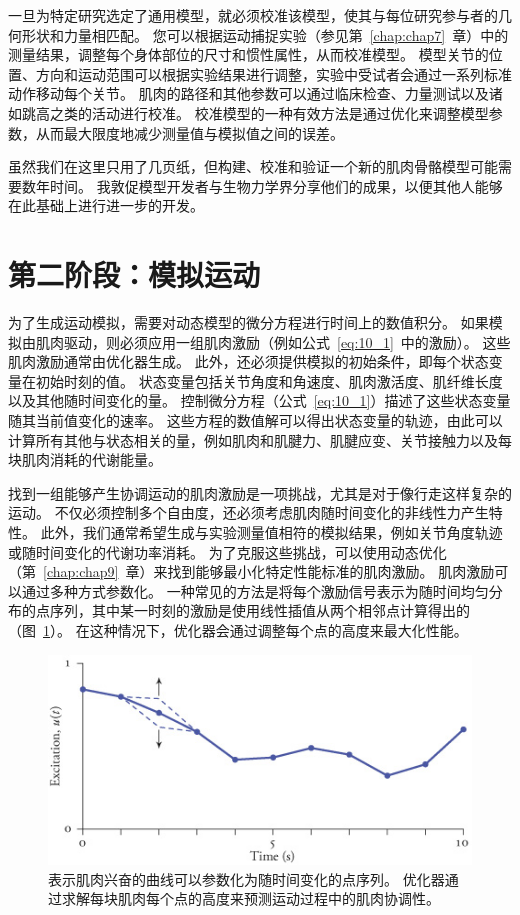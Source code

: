 一旦为特定研究选定了通用模型，就必须校准该模型，使其与每位研究参与者的几何形状和力量相匹配。
您可以根据运动捕捉实验（参见第~\ref{chap:chap7}~章）中的测量结果，调整每个身体部位的尺寸和惯性属性，从而校准模型。
模型关节的位置、方向和运动范围可以根据实验结果进行调整，实验中受试者会通过一系列标准动作移动每个关节。
肌肉的路径和其他参数可以通过临床检查、力量测试以及诸如跳高之类的活动进行校准。
校准模型的一种有效方法是通过优化来调整模型参数，从而最大限度地减少测量值与模拟值之间的误差。


虽然我们在这里只用了几页纸，但构建、校准和验证一个新的肌肉骨骼模型可能需要数年时间。
我敦促模型开发者与生物力学界分享他们的成果，以便其他人能够在此基础上进行进一步的开发。



\section{第二阶段：模拟运动}

为了生成运动模拟，需要对动态模型的微分方程进行时间上的数值积分。
如果模拟由肌肉驱动，则必须应用一组肌肉激励（例如公式~\ref{eq:10_1}~中的激励）。
这些肌肉激励通常由优化器生成。
此外，还必须提供模拟的初始条件，即每个状态变量在初始时刻的值。
状态变量包括关节角度和角速度、肌肉激活度、肌纤维长度以及其他随时间变化的量。
控制微分方程（公式~\ref{eq:10_1}）描述了这些状态变量随其当前值变化的速率。
这些方程的数值解可以得出状态变量的轨迹，由此可以计算所有其他与状态相关的量，例如肌肉和肌腱力、肌腱应变、关节接触力以及每块肌肉消耗的代谢能量。


找到一组能够产生协调运动的肌肉激励是一项挑战，尤其是对于像行走这样复杂的运动。
不仅必须控制多个自由度，还必须考虑肌肉随时间变化的非线性力产生特性。
此外，我们通常希望生成与实验测量值相符的模拟结果，例如关节角度轨迹或随时间变化的代谢功率消耗。
为了克服这些挑战，可以使用动态优化（第~\ref{chap:chap9}~章）来找到能够最小化特定性能标准的肌肉激励。
肌肉激励可以通过多种方式参数化。
一种常见的方法是将每个激励信号表示为随时间均匀分布的点序列，其中某一时刻的激励是使用线性插值从两个相邻点计算得出的（图~\ref{fig:10_7}）。
在这种情况下，优化器会通过调整每个点的高度来最大化性能。


\begin{figure}[!htb]
	\centering
	\includegraphics[width=0.8\linewidth]{chap10/10_7}
	\caption{表示肌肉兴奋的曲线可以参数化为随时间变化的点序列。
		优化器通过求解每块肌肉每个点的高度来预测运动过程中的肌肉协调性。 \label{fig:10_7}}
\end{figure}

